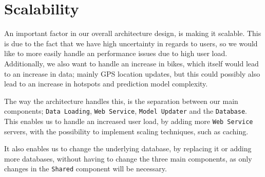\section{Scalability}
An important factor in our overall architecture design, is making it scalable.
This is due to the fact that we have high uncertainty in regards to users, so we would like to more easily handle an performance issues due to high user load.
Additionally, we also want to handle an increase in bikes, which itself would lead to an increase in data; mainly GPS location updates, but this could possibly also lead to an increase in hotspots and prediction model complexity.

The way the architecture handles this, is the separation between our main components; \texttt{Data Loading}, \texttt{Web Service}, \texttt{Model Updater} and the \texttt{Database}.
This enables us to handle an increased user load, by adding more \texttt{Web Service} servers, with the possibility to implement scaling techniques, such as caching.\cite{scalability}

It also enables us to change the underlying database, by replacing it or adding more databases, without having to change the three main components, as only changes in the \texttt{Shared} component will be necessary.
